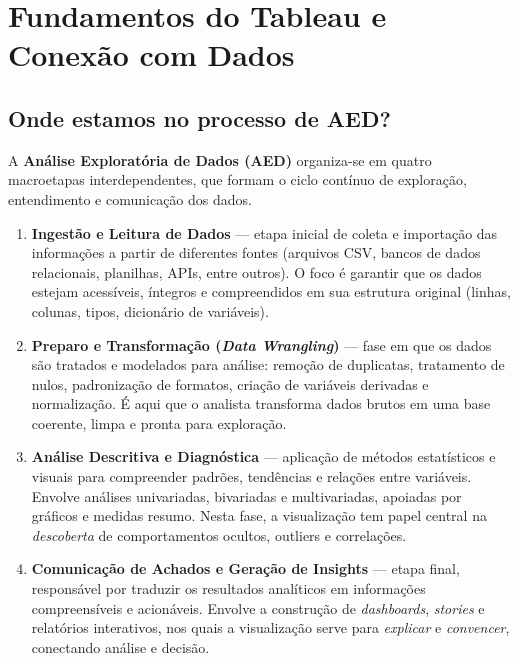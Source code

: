 \chapter{Fundamentos do Tableau e Conexão com Dados} %


\section{Onde estamos no processo de AED?}

A \textbf{Análise Exploratória de Dados (AED)} organiza-se em quatro macroetapas interdependentes, que formam o ciclo contínuo de exploração, entendimento e comunicação dos dados. 

\begin{enumerate}[leftmargin=*]
  \item \textbf{Ingestão e Leitura de Dados} — etapa inicial de coleta e importação das informações a partir de diferentes fontes (arquivos CSV, bancos de dados relacionais, planilhas, APIs, entre outros). O foco é garantir que os dados estejam acessíveis, íntegros e compreendidos em sua estrutura original (linhas, colunas, tipos, dicionário de variáveis).

  \item \textbf{Preparo e Transformação (\textit{Data Wrangling})} — fase em que os dados são tratados e modelados para análise: remoção de duplicatas, tratamento de nulos, padronização de formatos, criação de variáveis derivadas e normalização. É aqui que o analista transforma dados brutos em uma base coerente, limpa e pronta para exploração.

  \item \textbf{Análise Descritiva e Diagnóstica} — aplicação de métodos estatísticos e visuais para compreender padrões, tendências e relações entre variáveis. Envolve análises univariadas, bivariadas e multivariadas, apoiadas por gráficos e medidas resumo. Nesta fase, a visualização tem papel central na \textit{descoberta} de comportamentos ocultos, outliers e correlações.

  \item \textbf{Comunicação de Achados e Geração de Insights} — etapa final, responsável por traduzir os resultados analíticos em informações compreensíveis e acionáveis. Envolve a construção de \textit{dashboards}, \textit{stories} e relatórios interativos, nos quais a visualização serve para \textit{explicar} e \textit{convencer}, conectando análise e decisão.
\end{enumerate}

